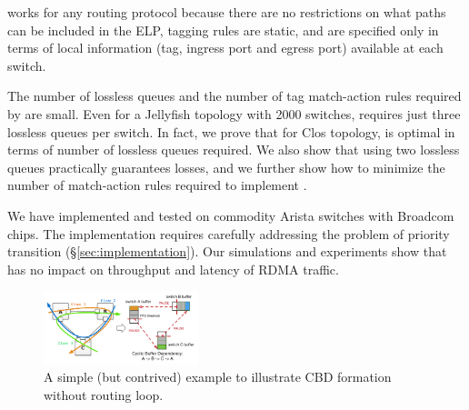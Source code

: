 \sysname{} works for any routing protocol because there are no restrictions on
what paths can be included in the ELP, tagging rules are static, and are
specified only in terms of local information (tag, ingress port and egress port)
available at each switch.

The number of lossless queues and the number of tag match-action rules required
by \sysname{} are small.  Even for a Jellyfish topology with 2000 switches,
\sysname{} requires just three lossless queues per switch.  In fact, we prove
that for Clos topology,  \sysname{} is optimal in terms of number of lossless
queues required. We also show that using two lossless queues practically guarantees losses, 
and we further show how to minimize the number of match-action rules
required to implement \sysname{}.

We have implemented and tested \sysname{} on commodity Arista switches with Broadcom chips. 
The implementation requires carefully addressing the problem
of priority transition (\S\ref{sec:implementation}). Our simulations and experiments show that
\sysname{} has no impact on throughput and latency of RDMA traffic.

\begin{figure}[t]
		\centering
		\includegraphics[width=0.4\textwidth] {figs/deadlock}
		\vspace{-1em}
		\caption{A simple (but contrived) example to illustrate CBD formation
		without routing loop.}
		\vspace{-0.2in}
		\label{fig:basic_deadlock}
\end{figure}
